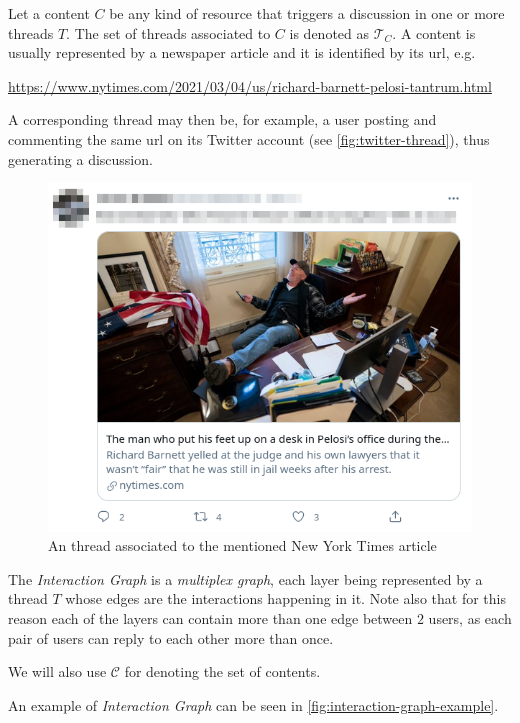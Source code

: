 Let a content $C$ be any kind of resource that triggers a discussion in one or
more threads $T$. The set of threads associated to $C$ is denoted as
$\mathcal{T}_{C} $. A content is usually represented by a newspaper article and
it is identified by its url, e.g.

	{\footnotesize
		\begin{center}
			\url{https://www.nytimes.com/2021/03/04/us/richard-barnett-pelosi-tantrum.html}
		\end{center}
	}

A corresponding thread may then be, for example, a user posting and commenting
the same url on its Twitter account (see \autoref{fig:twitter-thread}), thus
generating a discussion.

\begin{figure}
	\centering
	\includegraphics[width=0.6\linewidth]{tex/img/twitter_thread.png}
	\caption{An thread associated to the mentioned New York Times article}%
	\label{fig:twitter-thread}
\end{figure}

The \emph{Interaction Graph} is a \emph{multiplex graph}, each layer being
represented by a thread $T$ whose edges are the interactions happening in it.
Note also that for this reason each of the layers can contain more than one
edge between $2$ users, as each pair of users can reply to each other more than
once.

We will also use $\mathcal{C} $ for denoting the set of contents.

An example of \emph{Interaction Graph} can be seen in
\autoref{fig:interaction-graph-example}.

